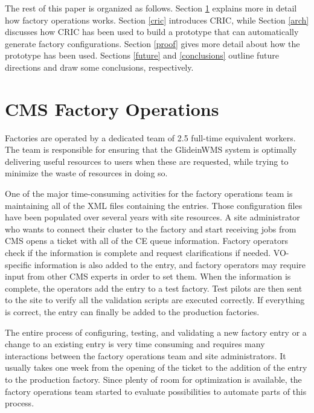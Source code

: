 \documentclass{webofc}
\begin{document}
The rest of this paper is organized as follows. Section \ref{facops} explains more in detail how factory operations works. Section \ref{cric} introduces CRIC, while Section \ref{arch} discusses how CRIC has been used to build a prototype that can automatically generate factory configurations. Section \ref{proof} gives more detail about how the prototype has been used. Sections \ref{future} and \ref{conclusions} outline future directions and draw some conclusions, respectively.


\section{CMS Factory Operations}
\label{facops}
Factories are operated by a dedicated team of 2.5 full-time equivalent workers. The team is responsible for ensuring that the GlideinWMS system is optimally delivering useful resources to users when these are requested, while trying to minimize the waste of resources in doing so.

One of the major time-consuming activities for the factory operations team is maintaining all of the XML files containing the entries. Those configuration files have been populated over several years with site resources. %
A site administrator who wants to connect their cluster to the factory and start receiving jobs from CMS opens a ticket with all of the CE queue information. Factory operators check if the information is complete and request clarifications if needed. VO-specific information is also added to the entry, and factory operators may require input from other CMS experts in order to set them. When the information is complete, the operators add the entry to a test factory. Test pilots are then sent to the site to verify all the validation scripts are executed correctly. If everything is correct, the entry can finally be added to the production factories.

The entire process of configuring, testing, and validating a new factory entry or a change to an existing entry is very time consuming and requires many interactions between the factory operations team and site administrators. It usually takes one week from the opening of the ticket to the addition of the entry to the production factory. Since plenty of room for optimization is available, the factory operations team started to evaluate possibilities to automate parts of this process.
\end{document}

